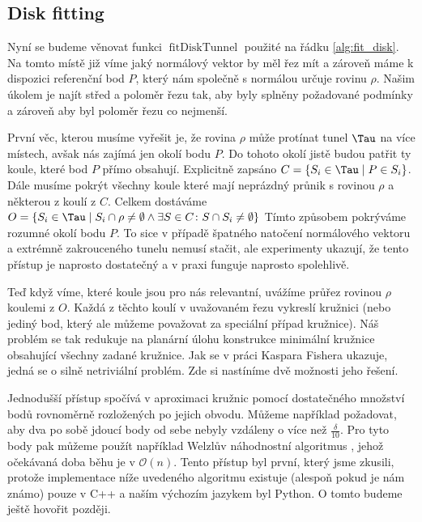 \subsection{Disk fitting} \label{subsec:disk_fit}
Nyní se budeme věnovat funkci $ \operatorname{fitDiskTunnel} $ použité na řádku
\ref{alg:fit_disk}. Na tomto místě již víme jaký normálový vektor by měl řez mít a
zároveň máme k dispozici referenční bod $ P $, který nám společně s normálou
určuje rovinu $ \rho $. Našim úkolem je najít střed a poloměr řezu tak, aby
byly splněny požadované podmínky a zároveň aby byl poloměr řezu co nejmenší.

První věc, kterou musíme vyřešit je, že rovina $ \rho $ může protínat tunel $ \Tau $
na více místech, avšak nás zajímá jen okolí bodu $ P $. Do tohoto okolí jistě
budou patřit ty koule, které bod $ P $ přímo obsahují. Explicitně
zapsáno $ C = \{S_i \in \Tau \mid P \in S_i \} $. Dále musíme pokrýt všechny
koule které mají neprázdný průnik s rovinou $ \rho $ a některou z koulí z $ C $.
Celkem dostáváme
$ O = \{ S_i \in \Tau \mid S_i \cap \rho \neq \emptyset \wedge \exists S \in C \colon S \cap S_i \neq \emptyset  \}$
Tímto způsobem pokrýváme rozumné okolí bodu $ P $. To sice v případě špatného
natočení normálového vektoru a extrémně zakrouceného tunelu nemusí stačit, ale
experimenty ukazují, že tento přístup je naprosto dostatečný a v praxi funguje
naprosto spolehlivě.

Teď když víme, které koule jsou pro nás relevantní, uvážíme průřez rovinou
$ \rho $ koulemi z $ O $. Každá z těchto koulí v uvažovaném řezu vykreslí
kružnici (nebo jediný bod, který ale můžeme považovat za speciální případ kružnice).
Náš problém se tak redukuje na planární úlohu konstrukce minimální kružnice obsahující
všechny zadané kružnice. Jak se v práci Kaspara Fishera \cite{FisherBalls} ukazuje,
jedná se o silně netriviální problém. Zde si nastíníme dvě možnosti jeho řešení.

Jednodušší přístup spočívá v aproximaci kružnic pomocí dostatečného množství bodů
rovnoměrně rozložených po jejich obvodu. Můžeme například požadovat, aby dva
po sobě jdoucí body od sebe nebyly vzdáleny o více než $ \frac{\delta}{10} $.
Pro tyto body pak můžeme použít například Welzlův náhodnostní algoritmus
\cite{WelzlRandom}, jehož očekávaná doba běhu je v $ \mathcal{O}(n) $. Tento
přístup byl první, který jsme zkusili, protože implementace níže uvedeného algoritmu
existuje (alespoň pokud je nám známo) pouze v C++ a naším výchozím jazykem byl
Python. O tomto budeme ještě hovořit později.

